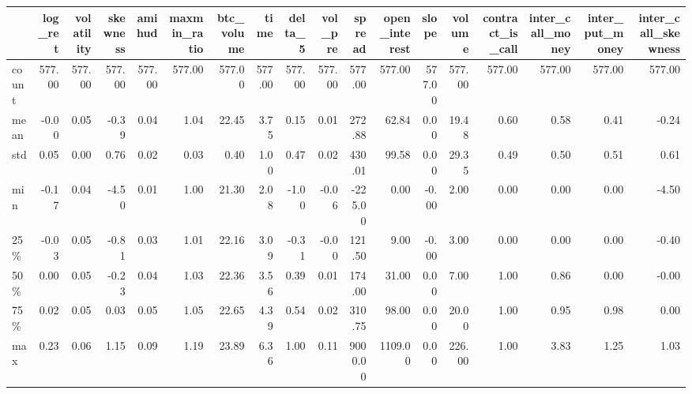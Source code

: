 \begin{tabular}{lrrrrrrrrrrrrrrrrr}
\toprule
{} &  log\_ret &  volatility &  skewness &  amihud &  maxmin\_ratio &  btc\_volume &   time &  delta\_5 &  vol\_pre &  spread &  open\_interest &  slope &  volume &  contract\_is\_call &  inter\_call\_money &  inter\_put\_money &  inter\_call\_skewness \\
\midrule
count &   577.00 &      577.00 &    577.00 &  577.00 &        577.00 &      577.00 & 577.00 &   577.00 &   577.00 &  577.00 &         577.00 & 577.00 &  577.00 &            577.00 &            577.00 &           577.00 &               577.00 \\
mean  &    -0.00 &        0.05 &     -0.39 &    0.04 &          1.04 &       22.45 &   3.75 &     0.15 &     0.01 &  272.88 &          62.84 &   0.00 &   19.48 &              0.60 &              0.58 &             0.41 &                -0.24 \\
std   &     0.05 &        0.00 &      0.76 &    0.02 &          0.03 &        0.40 &   1.00 &     0.47 &     0.02 &  430.01 &          99.58 &   0.00 &   29.35 &              0.49 &              0.50 &             0.51 &                 0.61 \\
min   &    -0.17 &        0.04 &     -4.50 &    0.01 &          1.00 &       21.30 &   2.08 &    -1.00 &    -0.06 & -225.00 &           0.00 &  -0.00 &    2.00 &              0.00 &              0.00 &             0.00 &                -4.50 \\
25\%   &    -0.03 &        0.05 &     -0.81 &    0.03 &          1.01 &       22.16 &   3.09 &    -0.31 &    -0.00 &  121.50 &           9.00 &  -0.00 &    3.00 &              0.00 &              0.00 &             0.00 &                -0.40 \\
50\%   &     0.00 &        0.05 &     -0.23 &    0.04 &          1.03 &       22.36 &   3.56 &     0.39 &     0.01 &  174.00 &          31.00 &   0.00 &    7.00 &              1.00 &              0.86 &             0.00 &                -0.00 \\
75\%   &     0.02 &        0.05 &      0.03 &    0.05 &          1.05 &       22.65 &   4.39 &     0.54 &     0.02 &  310.75 &          98.00 &   0.00 &   20.00 &              1.00 &              0.95 &             0.98 &                 0.00 \\
max   &     0.23 &        0.06 &      1.15 &    0.09 &          1.19 &       23.89 &   6.36 &     1.00 &     0.11 & 9000.00 &        1109.00 &   0.00 &  226.00 &              1.00 &              3.83 &             1.25 &                 1.03 \\
\bottomrule
\end{tabular}
